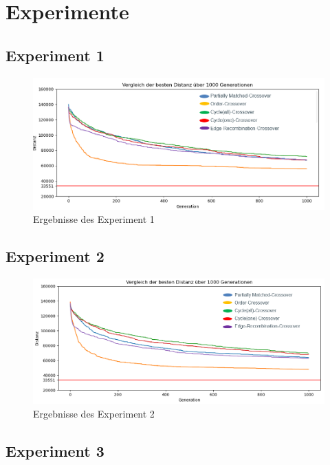 
\section{Experimente}

\subsection{Experiment 1}

\begin{figure}[H]
\centering
\includegraphics[width=1\textwidth]{img/Vortrag/experiment1.png}
\caption{Ergebnisse des Experiment 1}
\label{fig:experiment1}
\end{figure}

\subsection{Experiment 2}

\begin{figure}[H]
\centering
\includegraphics[width=1\textwidth]{img/Vortrag/experiment2.png}
\caption{Ergebnisse des Experiment 2}
\label{fig:experiment2}
\end{figure}

\subsection{Experiment 3}

